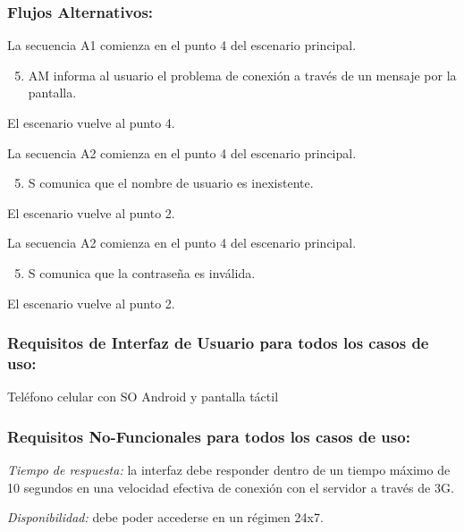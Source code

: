 \begin{framed}
\subsubsection{Flujos Alternativos: }

La secuencia A1 comienza en el punto 4 del escenario principal. 
\begin{enumerate}
    \setcounter{enumi}{4}
    \item AM informa al usuario el problema de conexión a través de un mensaje por la pantalla. 
\end{enumerate}
El escenario vuelve al punto 4. 


La secuencia A2 comienza en el punto 4 del escenario principal.
\begin{enumerate}
    \setcounter{enumi}{4}
        \item S comunica que el nombre de usuario es inexistente. 
\end{enumerate}
El escenario vuelve al punto 2. 


La secuencia A2 comienza en el punto 4 del escenario principal. 
\begin{enumerate}
    \setcounter{enumi}{4}
    \item S comunica que la contraseña es inválida. 
\end{enumerate}
El escenario vuelve al punto 2. 


\subsubsection{Requisitos de Interfaz de Usuario para todos los casos de uso: }
Teléfono celular con SO Android y pantalla táctil 

\subsubsection{Requisitos No-Funcionales para todos los casos de uso:}
\emph{Tiempo de respuesta:} la interfaz debe responder dentro de un tiempo máximo de 10 segundos en una velocidad efectiva de conexión con el servidor a través de 3G.

\emph{Disponibilidad:} debe poder accederse en un régimen 24x7.
\end{framed}


